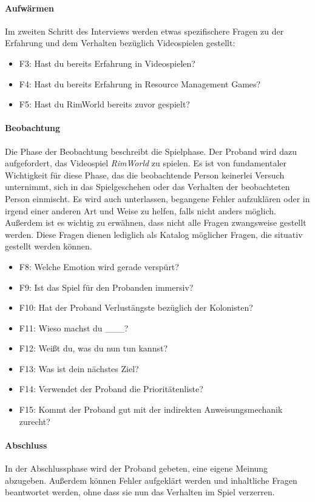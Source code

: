 \paragraph{Aufwärmen}
Im zweiten Schritt des Interviews werden etwas spezifischere Fragen zu der Erfahrung und dem Verhalten bezüglich Videospielen gestellt:
\begin{itemize}
    \item F3: Hast du bereits Erfahrung in Videospielen?
    \item F4: Hast du bereits Erfahrung in Resource Management Games?
    \item F5: Hast du RimWorld bereits zuvor gespielt?
\end{itemize}

\paragraph{Beobachtung}
Die Phase der Beobachtung beschreibt die Spielphase. Der Proband wird dazu aufgefordert, das Videospiel \textit{RimWorld} zu spielen. Es ist von fundamentaler Wichtigkeit für diese Phase, das die beobachtende Person keinerlei Versuch unternimmt, sich in das Spielgeschehen oder das Verhalten der beobachteten Person einmischt. Es wird auch unterlassen, begangene Fehler aufzuklären oder in irgend einer anderen Art und Weise zu helfen, falls nicht anders möglich. Außerdem ist es wichtig zu erwähnen, dass nicht alle Fragen zwangsweise gestellt werden. Diese Fragen dienen lediglich als Katalog möglicher Fragen, die situativ gestellt werden können.

\begin{itemize}
    \item F8: Welche Emotion wird gerade verspürt?
    \item F9: Ist das Spiel für den Probanden immersiv?
    \item F10: Hat der Proband Verlustängste bezüglich der Kolonisten?
    \item F11: Wieso machst du \_\_\_?
    \item F12: Weißt du, was du nun tun kannst?
    \item F13: Was ist dein nächstes Ziel?
    \item F14: Verwendet der Proband die Prioritätenliste?
    \item F15: Kommt der Proband gut mit der indirekten Anweisungsmechanik zurecht?
\end{itemize}

\paragraph{Abschluss}
In der Abschlussphase wird der Proband gebeten, eine eigene Meinung abzugeben. Außerdem können Fehler aufgeklärt werden und inhaltliche Fragen beantwortet werden, ohne dass sie nun das Verhalten im Spiel verzerren.

